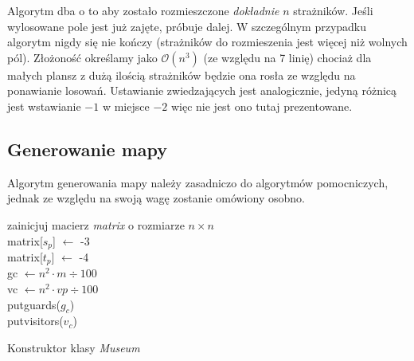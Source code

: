 \documentclass[12pt]{article}
\begin{document}
Algorytm dba o to aby zostało rozmieszczone \emph{dokładnie} $n$ strażników. Jeśli wylosowane pole jest już zajęte, próbuje dalej. W szczególnym przypadku algorytm nigdy się nie kończy (strażników do rozmieszenia jest więcej niż wolnych pól). Złożoność określamy jako $\mathcal{O}(n^3)$ (ze względu na 7 linię) chociaż dla małych plansz z dużą ilością strażników będzie ona rosła ze względu na ponawianie losowań. Ustawianie zwiedzających jest analogicznie, jedyną różnicą jest wstawianie $-1$ w miejsce $-2$ więc nie jest ono tutaj prezentowane.

\subsection{Generowanie mapy}
Algorytm generowania mapy należy zasadniczo do algorytmów pomocniczych, jednak ze względu na swoją wagę zostanie omówiony osobno.

\begin{algorithm}[H]
\Begin
{
	zainicjuj macierz \emph{matrix} o rozmiarze $n\times n$ \\
	matrix[$s_p$] $\leftarrow$ -3 \\
	matrix[$t_p$] $\leftarrow$ -4 \\
	gc $\leftarrow n^2 \cdot m \div 100 $ \\
	vc $\leftarrow n^2 \cdot vp \div 100 $ \\
	put\textunderscore guards($g_c$) \\
	put\textunderscore visitors($v_c$)	
}
\caption{Konstruktor klasy \emph{Museum}}
\end{algorithm}
\end{document}
